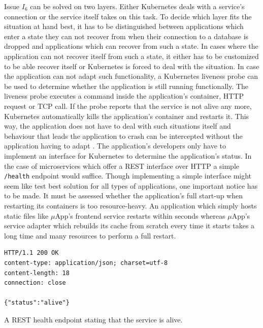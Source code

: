 Issue $I_6$ can be solved on two layers. Either Kubernetes deals with a
service's connection or the service itself takes on this task. To decide which
layer fits the situation at hand best, it has to be distinguished between
applications which enter a state they can not recover from when their
connection to a database is dropped and applications which can recover from
such a state. In cases where the application can not recover itself from such a
state, it either has to be customized to be able recover itself or Kubernetes
is forced to deal with the situation. In case the application can not adapt
such functionality, a Kubernetes liveness probe can be used to determine
whether the application is still running functionally. The liveness probe
executes a command inside the application's container, \ac{HTTP} request or
\ac{TCP} call. If the probe reports that the service is not alive any more,
Kubernetes automatically kills the application's container and restarts it.
This way, the application does not have to deal with such situations itself and
behaviour that leads the application to crash can be intercepted without the
application having to adapt \autocite{AuthorsConfigureLivenessReadiness2019}.
The application's developers only have to implement an interface for Kubernetes
to determine the application's status. In the case of microservices which offer
a \ac{REST} interface over \ac{HTTP} a simple \texttt{/health} endpoint would
suffice. Though implementing a simple interface might seem like test best
solution for all types of applications, one important notice has to be made. It
must be assessed whether the application's full start-up when restarting its
containers is too resource-heavy. An application which simply hosts static
files like $\mu$App's frontend service restarts within seconds whereas
$\mu$App's service adapter which rebuilds its cache from scratch every time it
starts takes a long time and many resources to perform a full restart.

\begin{listing}[H]
  \begin{verbatim}
HTTP/1.1 200 OK
content-type: application/json; charset=utf-8
content-length: 18
connection: close

{"status":"alive"}
  \end{verbatim}
  \caption[A REST health endpoint stating that the service is alive.]{A
  \ac{REST} health endpoint stating that the service is alive.}%
  \label{listing:health_endpoint_http}
\end{listing}

